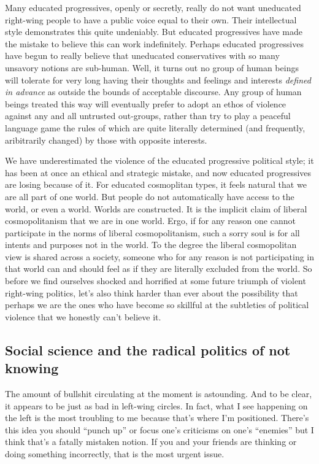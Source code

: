 \documentclass[a4paper,12pt,margin=.5in]{article}
\begin{document}
Many educated progressives, openly or secretly, really do not want
uneducated right-wing people to have a public voice equal to their own.
Their intellectual style demonstrates this quite undeniably. But
educated progressives have made the mistake to believe this can work
indefinitely. Perhaps educated progressives have begun to really believe
that uneducated conservatives with so many unsavory notions are
sub-human. Well, it turns out no group of human beings will tolerate for
very long having their thoughts and feelings and interests \emph{defined
in advance} as outside the bounds of acceptable discourse. Any group of
human beings treated this way will eventually prefer to adopt an ethos
of violence against any and all untrusted out-groups, rather than try to
play a peaceful language game the rules of which are quite literally
determined (and frequently, aribitrarily changed) by those with opposite
interests.

We have underestimated the violence of the educated progressive
political style; it has been at once an ethical and strategic mistake,
and now educated progressives are losing because of it. For educated
cosmoplitan types, it feels natural that we are all part of one world.
But people do not automatically have access to the world, or even a
world. Worlds are constructed. It is the implicit claim of liberal
cosmopolitanism that we are in one world. Ergo, if for any reason one
cannot participate in the norms of liberal cosmopolitanism, such a sorry
soul is for all intents and purposes not in the world. To the degree the
liberal cosmopolitan view is shared across a society, someone who for
any reason is not participating in that world can and should feel as if
they are literally excluded from the world. So before we find ourselves
shocked and horrified at some future triumph of violent right-wing
politics, let's also think harder than ever about the possibility that
perhaps we are the ones who have become so skillful at the subtleties of
political violence that we honestly can't believe it.

\subsection{Social science and the radical politics of not
knowing}\label{social-science-and-the-radical-politics-of-not-knowing}

The amount of bullshit circulating at the moment is astounding. And to
be clear, it appears to be just as bad in left-wing circles. In fact,
what I see happening on the left is the most troubling to me because
that's where I'm positioned. There's this idea you should ``punch up''
or focus one's criticisms on one's ``enemies'' but I think that's a
fatally mistaken notion. If you and your friends are thinking or doing
something incorrectly, that is the most urgent issue.
\end{document}
